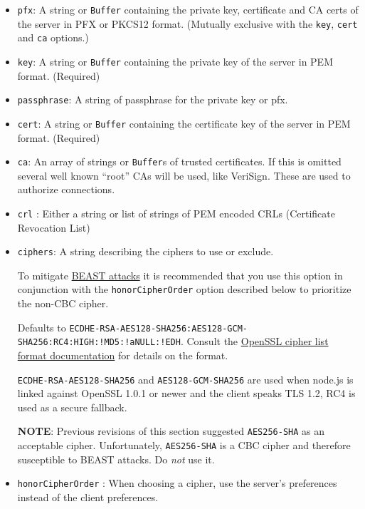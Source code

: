 \begin{itemize}
\item
  \texttt{pfx}: A string or \texttt{Buffer} containing the private key,
  certificate and CA certs of the server in PFX or PKCS12 format.
  (Mutually exclusive with the \texttt{key}, \texttt{cert} and
  \texttt{ca} options.)
\item
  \texttt{key}: A string or \texttt{Buffer} containing the private key
  of the server in PEM format. (Required)
\item
  \texttt{passphrase}: A string of passphrase for the private key or
  pfx.
\item
  \texttt{cert}: A string or \texttt{Buffer} containing the certificate
  key of the server in PEM format. (Required)
\item
  \texttt{ca}: An array of strings or \texttt{Buffer}s of trusted
  certificates. If this is omitted several well known ``root'' CAs will
  be used, like VeriSign. These are used to authorize connections.
\item
  \texttt{crl} : Either a string or list of strings of PEM encoded CRLs
  (Certificate Revocation List)
\item
  \texttt{ciphers}: A string describing the ciphers to use or exclude.

  To mitigate
  \href{http://blog.ivanristic.com/2011/10/mitigating-the-beast-attack-on-tls.html}{BEAST
  attacks} it is recommended that you use this option in conjunction
  with the \texttt{honorCipherOrder} option described below to
  prioritize the non-CBC cipher.

  Defaults to
  \texttt{ECDHE-RSA-AES128-SHA256:AES128-GCM-SHA256:RC4:HIGH:!MD5:!aNULL:!EDH}.
  Consult the
  \href{http://www.openssl.org/docs/apps/ciphers.html\#CIPHER\_LIST\_FORMAT}{OpenSSL
  cipher list format documentation} for details on the format.

  \texttt{ECDHE-RSA-AES128-SHA256} and \texttt{AES128-GCM-SHA256} are
  used when node.js is linked against OpenSSL 1.0.1 or newer and the
  client speaks TLS 1.2, RC4 is used as a secure fallback.

  \textbf{NOTE}: Previous revisions of this section suggested
  \texttt{AES256-SHA} as an acceptable cipher. Unfortunately,
  \texttt{AES256-SHA} is a CBC cipher and therefore susceptible to BEAST
  attacks. Do \emph{not} use it.
\item
  \texttt{honorCipherOrder} : When choosing a cipher, use the server's
  preferences instead of the client preferences.


\end{itemize}
